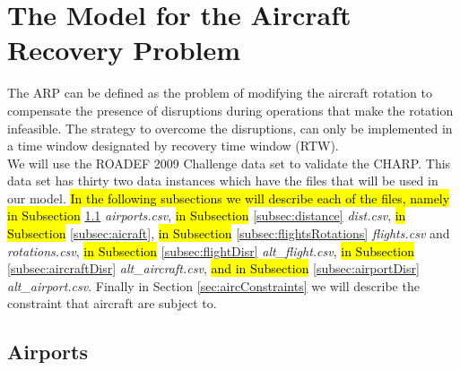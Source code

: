 \documentclass[ijoo,nonblindrev]{informs-ijoo}
\begin{document}
%


\section{The Model for the Aircraft Recovery Problem}\label{sec:modelARP}
The ARP can be defined as the problem of modifying the aircraft rotation to compensate the presence of disruptions during operations that make the rotation infeasible. The strategy to overcome the disruptions, can only be implemented in a time window designated by recovery time window (RTW).\\
	 We will use the ROADEF 2009 Challenge data set to validate the CHARP. This data set has thirty two data instances which have the files that will be used in our model. \hl{In the following subsections we will describe each of the files, namely in Subsection } \ref{subsec:airports} \textit{airports.csv}, \hl{in Subsection} \ref{subsec:distance} \textit{dist.csv}, \hl{in Subsection} \ref{subsec:aicraft}, \hl{in Subsection} \ref{subsec:flightsRotations} \textit{flights.csv} and \textit{rotations.csv}, \hl{in Subsection} \ref{subsec:flightDisr} \textit{alt\_flight.csv}, \hl{in Subsection} \ref{subsec:aircraftDisr} \textit{alt\_aircraft.csv}, \hl{and in Subsection} \ref{subsec:airportDisr} \textit{alt\_airport.csv}. Finally in Section \ref{sec:aircConstraints} we will describe the constraint that aircraft are subject to.
	 




\subsection{Airports} \label{subsec:airports}
\end{document}
